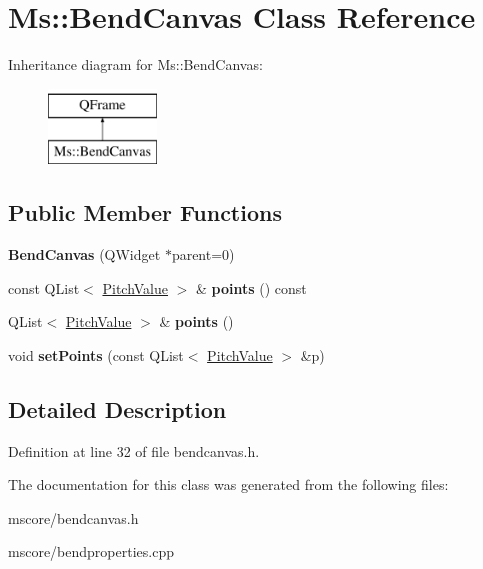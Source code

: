 \hypertarget{class_ms_1_1_bend_canvas}{}\section{Ms\+:\+:Bend\+Canvas Class Reference}
\label{class_ms_1_1_bend_canvas}
Inheritance diagram for Ms\+:\+:Bend\+Canvas\+:\begin{figure}[H]
\begin{center}
\leavevmode
\includegraphics[height=2.000000cm]{class_ms_1_1_bend_canvas}
\end{center}
\end{figure}
\subsection*{Public Member Functions}
\begin{DoxyCompactItemize}
\item 
\mbox{\label{class_ms_1_1_bend_canvas_aa574cbe9af4189a63d66fb8b1dba433c}} 
{\bfseries Bend\+Canvas} (Q\+Widget $\ast$parent=0)
\item 
\mbox{\label{class_ms_1_1_bend_canvas_a0027f4ee32c781e69755a7599f4f4a54}} 
const Q\+List$<$ \hyperlink{struct_ms_1_1_pitch_value}{Pitch\+Value} $>$ \& {\bfseries points} () const
\item 
\mbox{\label{class_ms_1_1_bend_canvas_a3835c6b20f2a553c20bd2e480751bc6a}} 
Q\+List$<$ \hyperlink{struct_ms_1_1_pitch_value}{Pitch\+Value} $>$ \& {\bfseries points} ()
\item 
\mbox{\label{class_ms_1_1_bend_canvas_a6a24da2bf006696f3201898598862be5}} 
void {\bfseries set\+Points} (const Q\+List$<$ \hyperlink{struct_ms_1_1_pitch_value}{Pitch\+Value} $>$ \&p)
\end{DoxyCompactItemize}


\subsection{Detailed Description}


Definition at line 32 of file bendcanvas.\+h.



The documentation for this class was generated from the following files\+:\begin{DoxyCompactItemize}
\item 
mscore/bendcanvas.\+h\item 
mscore/bendproperties.\+cpp\end{DoxyCompactItemize}
